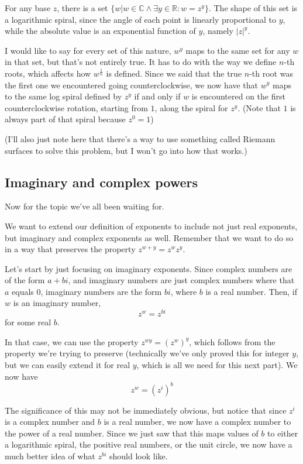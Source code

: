 \documentclass[11pt, oneside]{article}   	%
\begin{document}
For any base $z$, there is a set $\{w|w\in\mathbb{C}\land \exists y\in\mathbb{R}:w=z^y\}$. The shape of this set is a logarithmic spiral, since the angle of each point is linearly proportional to $y$, while the absolute value is an exponential function of $y$, namely $|z|^y$.

I would like to say for every set of this nature, $w^y$ maps to the same set for any $w$ in that set, but that's not entirely true. It has to do with the way we define $n$-th roots, which affects how $w^\frac{1}{n}$ is defined. Since we said that the true $n$-th root was the first one we encountered going counterclockwise, we now have that $w^y$ maps to the same log spiral defined by $z^y$ if and only if $w$ is encountered on the first counterclockwise rotation, starting from $1$, along the spiral for $z^y$. (Note that $1$ is always part of that spiral because $z^0=1$)

(I'll also just note here that there's a way to use something called Riemann surfaces to solve this problem, but I won't go into how that works.)

\subsection{Imaginary and complex powers}

Now for the topic we've all been waiting for.

We want to extend our definition of exponents to include not just real exponents, but imaginary and complex exponents as well. Remember that we want to do so in a way that preserves the property \(z^{w+y}=z^wz^y\).

Let's start by just focusing on imaginary exponents. Since complex numbers are of the form $a+bi$, and imaginary numbers are just complex numbers where that $a$ equals $0$, imaginary numbers are the form $bi$, where $b$ is a real number.
Then, if $w$ is an imaginary number, \[z^w=z^{bi}\] for some real $b$.

In that case, we can use the property \(z^{wy}=(z^w)^y\), which follows from the property we're trying to preserve (technically we've only proved this for integer $y$, but we can easily extend it for real $y$, which is all we need for this next part).
We now have \[z^w=(z^i)^b\] 

The significance of this may not be immediately obvious, but notice that since $z^i$ is a complex number and $b$ is a real number, we now have a complex number to the power of a real number. Since we just saw that this maps values of $b$ to either a logarithmic spiral, the positive real numbers, or the unit circle, we now have a much better idea of what \(z^{bi}\) should look like.
\end{document}
